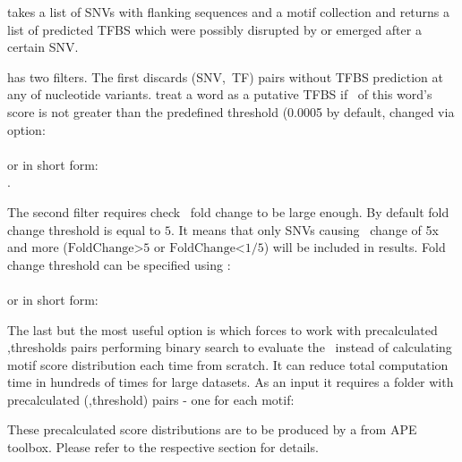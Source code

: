  takes a list of SNVs with flanking sequences and a motif collection and returns a list of predicted TFBS which were possibly disrupted by or emerged after a certain SNV.
\usageheader
{}


 has two filters. The first discards (SNV,~TF) pairs without TFBS prediction at any of nucleotide variants.  treat a word as a putative TFBS if \pvalue\ of this word's score is not greater than the predefined threshold (0.0005 by default, changed via  option:\\
\\
or in short form:\\
.

The second filter requires check \pvalue\ fold change to be large enough. By default fold change threshold is equal to $5$. It means that only SNVs causing \pvalue\ change of 5x and more ($\mbox{FoldChange>5}$ or $\mbox{FoldChange<1/5}$) will be included in results. Fold change threshold can be specified using :\\
\\
or in short form:\\

The last but the most useful option is  which forces  to work with precalculated \pvalue,thresholds pairs performing binary search to evaluate the \pvalue\ instead of calculating motif score distribution each time from scratch. It can reduce total computation time in hundreds of times for large datasets.
As an input it requires a folder with precalculated (\pvalue,threshold) pairs - one for each motif:\\

These precalculated score distributions are to be produced by a  from APE toolbox.
Please refer to the respective section for details.


\example{}

